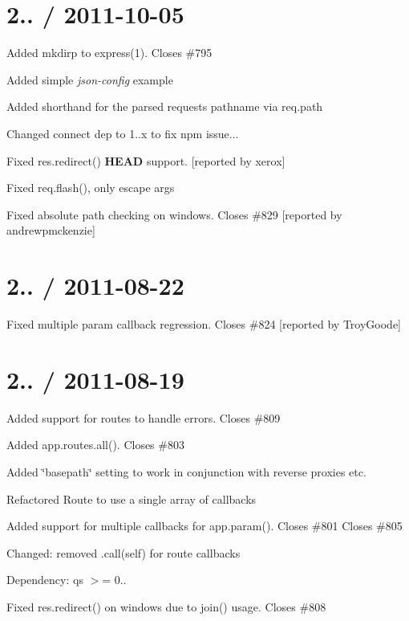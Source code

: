\section*{2.. / 2011-\/10-\/05 }


\begin{DoxyItemize}
\item Added mkdirp to express(1). Closes \#795
\item Added simple {\itshape json-\/config} example
\item Added shorthand for the parsed request\textquotesingle{}s pathname via {\ttfamily req.\+path}
\item Changed connect dep to 1..\+x to fix npm issue...
\item Fixed {\ttfamily res.\+redirect()} {\bfseries H\+E\+A\+D} support. \mbox{[}reported by xerox\mbox{]}
\item Fixed {\ttfamily req.\+flash()}, only escape args
\item Fixed absolute path checking on windows. Closes \#829 \mbox{[}reported by andrewpmckenzie\mbox{]}
\end{DoxyItemize}

\section*{2.. / 2011-\/08-\/22 }


\begin{DoxyItemize}
\item Fixed multiple param callback regression. Closes \#824 \mbox{[}reported by Troy\+Goode\mbox{]}
\end{DoxyItemize}

\section*{2.. / 2011-\/08-\/19 }


\begin{DoxyItemize}
\item Added support for routes to handle errors. Closes \#809
\item Added {\ttfamily app.\+routes.\+all()}. Closes \#803
\item Added \char`\"{}basepath\char`\"{} setting to work in conjunction with reverse proxies etc.
\item Refactored {\ttfamily Route} to use a single array of callbacks
\item Added support for multiple callbacks for {\ttfamily app.\+param()}. Closes \#801 Closes \#805
\item Changed\+: removed .call(self) for route callbacks
\item Dependency\+: {\ttfamily qs $>$= 0..}
\item Fixed {\ttfamily res.\+redirect()} on windows due to {\ttfamily join()} usage. Closes \#808
\end{DoxyItemize}

